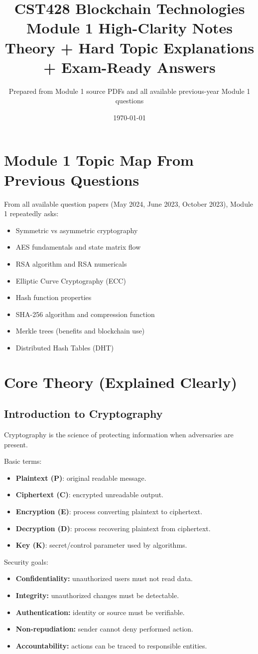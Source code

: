 \documentclass[12pt,a4paper]{article}
\title{\textbf{CST428 Blockchain Technologies}\\\Large Module 1 High-Clarity Notes\\\normalsize Theory + Hard Topic Explanations + Exam-Ready Answers}
\author{Prepared from Module 1 source PDFs and all available previous-year Module 1 questions}
\date{\today}
\begin{document}
\section{Module 1 Topic Map From Previous Questions}
From all available question papers (May 2024, June 2023, October 2023), Module 1 repeatedly asks:
\begin{itemize}
\item Symmetric vs asymmetric cryptography
\item AES fundamentals and state matrix flow
\item RSA algorithm and RSA numericals
\item Elliptic Curve Cryptography (ECC)
\item Hash function properties
\item SHA-256 algorithm and compression function
\item Merkle trees (benefits and blockchain use)
\item Distributed Hash Tables (DHT)
\end{itemize}

\section{Core Theory (Explained Clearly)}

\subsection{Introduction to Cryptography}
Cryptography is the science of protecting information when adversaries are present.

Basic terms:
\begin{itemize}
\item \textbf{Plaintext (P)}: original readable message.
\item \textbf{Ciphertext (C)}: encrypted unreadable output.
\item \textbf{Encryption (E)}: process converting plaintext to ciphertext.
\item \textbf{Decryption (D)}: process recovering plaintext from ciphertext.
\item \textbf{Key (K)}: secret/control parameter used by algorithms.
\end{itemize}

Security goals:
\begin{itemize}
\item \textbf{Confidentiality:} unauthorized users must not read data.
\item \textbf{Integrity:} unauthorized changes must be detectable.
\item \textbf{Authentication:} identity or source must be verifiable.
\item \textbf{Non-repudiation:} sender cannot deny performed action.
\item \textbf{Accountability:} actions can be traced to responsible entities.
\end{itemize}
\end{document}
